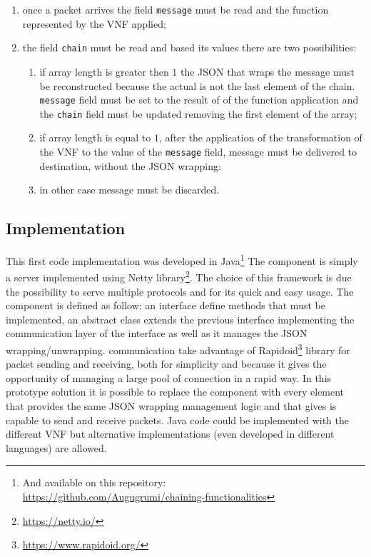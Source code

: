 \begin{enumerate}
  \item once a packet arrives the field \texttt{message} must be read and the
  function represented by the VNF applied;
  \item the field \texttt{chain} must be read and based its values there are two
  possibilities:
  \begin{enumerate}
    \item if array length is greater then $1$ the JSON that wraps the message
    must be reconstructed because the actual \vnf is not the last
    element of the chain. \texttt{message} field must be set to the result of
    of the function application and the \texttt{chain} field must be updated
    removing the first element of the array;
    \item if array length is equal to $1$, after the application of the
    transformation of the VNF to the value of the \texttt{message} field,
    message must be delivered to destination, without the JSON wrapping:
    \item in other case message must be discarded.
  \end{enumerate}
\end{enumerate}

\subsection{Implementation}
This first code implementation was developed in Java\footnote{And available on
this repository: \\\url{https://github.com/Augugrumi/chaining-functionalities}}
The \enchainer{} component is simply a server implemented using Netty
library\footnote{\url{https://netty.io/}}. The choice of this framework is due
the possibility to serve multiple protocols and for its quick and easy usage. 
The \vnf{} component is defined as follow: an interface define methods
that must be implemented, an abstract class extends the previous interface
implementing the communication layer of the interface as well as it manages the
JSON wrapping/unwrapping. \vnf{} communication take advantage of
Rapidoid\footnote{\url{https://www.rapidoid.org/}} library for packet sending
and receiving, both for simplicity and because it gives the opportunity of
managing a large pool of connection in a rapid way. In this prototype solution
it is possible to replace the \vnf{} component with every element that
provides the same JSON wrapping management logic and that gives is capable
to send and receive packets. Java code could be implemented with the different
VNF but alternative implementations (even developed in different languages) are
allowed. 

